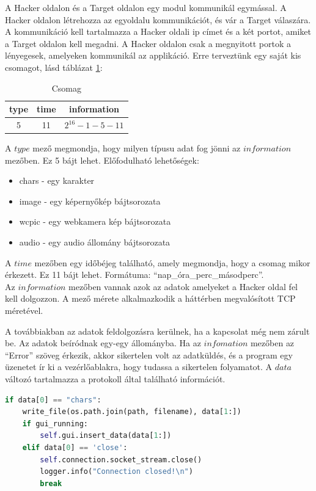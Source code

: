 \documentclass[12pt,a4paper,oneside]{report}
\begin{document}
A Hacker oldalon és a Target oldalon egy modul kommunikál egymással. A Hacker oldalon létrehozza az egyoldalu kommunikációt, és vár a Target válaszára. A kommunikáció kell tartalmazza a Hacker oldali ip címet és a két portot, amiket a Target oldalon kell megadni. A Hacker oldalon csak a megnyitott portok a lényegesek, amelyeken kommunikál az applikáció. Erre terveztünk egy saját kis csomagot, lásd táblázat \ref{tab:protocol}:
\begin{table}[H]
\centering
\caption{Csomag}
\label{tab:protocol}
\begin{tabular}{|c|c|c|}
\hline
\textbf{type} & \textbf{time} & \textbf{information} \\
\hline
5 & 11 & $2^{16}-1-5-11$ \\
\hline
\end{tabular}
\end{table}
A $type$ mező megmondja, hogy milyen típusu adat fog jönni az $information$ mezőben. Ez 5 bájt lehet. Előfodulható lehetőségek:
\begin{itemize}
\item chars - egy karakter
\item image - egy képernyőkép bájtsorozata
\item wcpic - egy webkamera kép bájtsorozata
\item audio - egy audio állomány bájtsorozata
\end{itemize}
A $time$ mezőben egy időbéjeg található, amely megmondja, hogy a csomag mikor érkezett. Ez 11 bájt lehet. Formátuma: ``nap\_óra\_perc\_másodperc''.\\
Az $information$ mezőben vannak azok az adatok amelyeket a Hacker oldal fel kell dolgozzon. A mező mérete alkalmazkodik a háttérben megvalósított TCP méretével.

A továbbiakban az adatok feldolgozásra kerülnek, ha a kapcsolat még nem zárult be. Az adatok beíródnak egy-egy állományba. Ha az $infomation$ mezőben az ``Error'' szöveg érkezik, akkor sikertelen volt az adatküldés, és a program egy üzenetet ír ki a vezérlőablakra, hogy tudassa a sikertelen folyamatot. A $data$ változó tartalmazza a protokoll által található információt.
\begin{lstlisting}[language=Python]
if data[0] == "chars":
	write_file(os.path.join(path, filename), data[1:])
	if gui_running:
		self.gui.insert_data(data[1:])
	elif data[0] == 'close':
		self.connection.socket_stream.close()
		logger.info("Connection closed!\n")
		break
\end{lstlisting}
\end{document}
